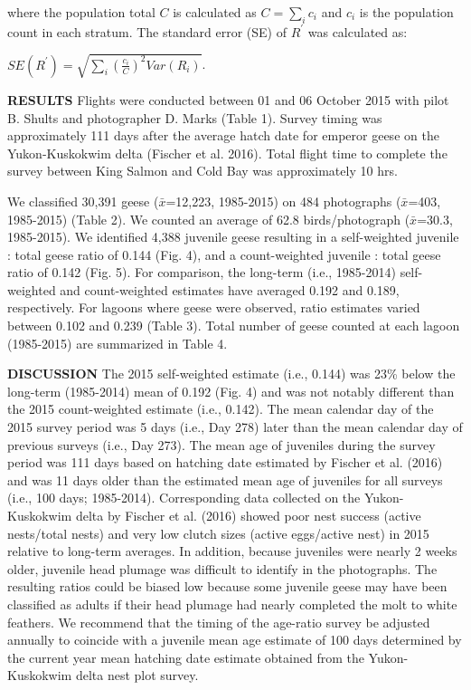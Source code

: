 \documentclass[]{article}
\begin{document}
\medskip
where the population total \(C\) is calculated as \(C = \sum_i {c_i}\)
and \({c_i}\) is the population count in each stratum. The standard
error (SE) of \(R^\prime\) was calculated as: \medskip

\begin{center}
$SE(R^\prime) = \sqrt {\sum_i  \left( \frac{c_i}{C} \right)^2 Var(R_i)}$.  
\end{center}

\smallskip

\setlength{\parskip}{4ex} \textbf{RESULTS}\newline
Flights were conducted between 01 and 06 October 2015 with pilot B.
Shults and photographer D. Marks (Table 1). Survey timing was
approximately 111 days after the average hatch date for emperor geese on
the Yukon-Kuskokwim delta (Fischer et al. 2016). Total flight time to
complete the survey between King Salmon and Cold Bay was approximately
10 hrs.

We classified 30,391 geese (\(\bar{x}\)=12,223, 1985-2015) on 484
photographs (\(\bar{x}\)=403, 1985-2015) (Table 2). We counted an
average of 62.8 birds/photograph (\(\bar{x}\)=30.3, 1985-2015). We
identified 4,388 juvenile geese resulting in a self-weighted juvenile :
total geese ratio of 0.144 (Fig. 4), and a count-weighted juvenile :
total geese ratio of 0.142 (Fig. 5). For comparison, the long-term
(i.e., 1985-2014) self-weighted and count-weighted estimates have
averaged 0.192 and 0.189, respectively. For lagoons where geese were
observed, ratio estimates varied between 0.102 and 0.239 (Table 3).
Total number of geese counted at each lagoon (1985-2015) are summarized
in Table 4.

\textbf{DISCUSSION}\newline
The 2015 self-weighted estimate (i.e., 0.144) was 23\% below the
long-term (1985-2014) mean of 0.192 (Fig. 4) and was not notably
different than the 2015 count-weighted estimate (i.e., 0.142). The mean
calendar day of the 2015 survey period was 5 days (i.e., Day 278) later
than the mean calendar day of previous surveys (i.e., Day 273). The mean
age of juveniles during the survey period was 111 days based on hatching
date estimated by Fischer et al. (2016) and was 11 days older than the estimated mean age of juveniles for all
surveys (i.e., 100 days; 1985-2014). Corresponding data collected on the
Yukon-Kuskokwim delta by Fischer et al. (2016) showed poor nest success
(active nests/total nests) and very low clutch sizes (active eggs/active
nest) in 2015 relative to long-term averages. In addition, because
juveniles were nearly 2 weeks older, juvenile head plumage was difficult
to identify in the photographs. The resulting ratios could be biased low
because some juvenile geese may have been classified as adults if their
head plumage had nearly completed the molt to white feathers. We
recommend that the timing of the age-ratio survey be adjusted annually
to coincide with a juvenile mean age estimate of 100 days determined by
the current year mean hatching date estimate obtained from the
Yukon-Kuskokwim delta nest plot survey.
\end{document}
